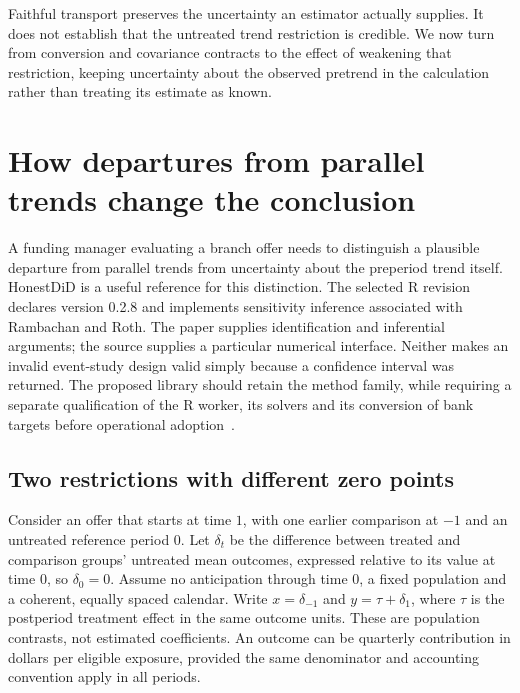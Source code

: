 Faithful transport preserves the uncertainty an estimator actually supplies.
It does not establish that the untreated trend restriction is credible. We
now turn from conversion and covariance contracts to the effect of weakening
that restriction, keeping uncertainty about the observed pretrend in the
calculation rather than treating its estimate as known.

\section{How departures from parallel trends change the conclusion}
\label{exec22:hd-scope}

A funding manager evaluating a branch offer needs to distinguish a plausible
departure from parallel trends from uncertainty about the preperiod trend itself.
HonestDiD is a useful reference for this distinction. The selected R revision
declares version 0.2.8 and implements sensitivity inference associated with
Rambachan and Roth. The paper supplies identification and inferential arguments;
the source supplies a particular numerical interface. Neither makes an invalid
event-study design valid simply because a confidence interval was returned.
The proposed library should retain the method family, while requiring a separate
qualification of the R worker, its solvers and its conversion of bank targets
before operational adoption~\citep{rambachan2023,exec22_honestdid_engine}.

\subsection{Two restrictions with different zero points}
\label{exec22:hd-restrictions}

Consider an offer that starts at time $1$, with one earlier comparison at $-1$
and an untreated reference period $0$. Let $\delta_t$ be the difference between
treated and comparison groups' untreated mean outcomes, expressed relative to
its value at time $0$, so $\delta_0=0$. Assume no anticipation through time $0$,
a fixed population and a coherent, equally spaced calendar. Write $x=\delta_{-1}$
and $y=\tau+\delta_1$, where $\tau$ is the postperiod treatment effect in the same
outcome units. These are population contrasts, not estimated coefficients.
An outcome can be quarterly contribution in dollars per eligible exposure,
provided the same denominator and accounting convention apply in all periods.

